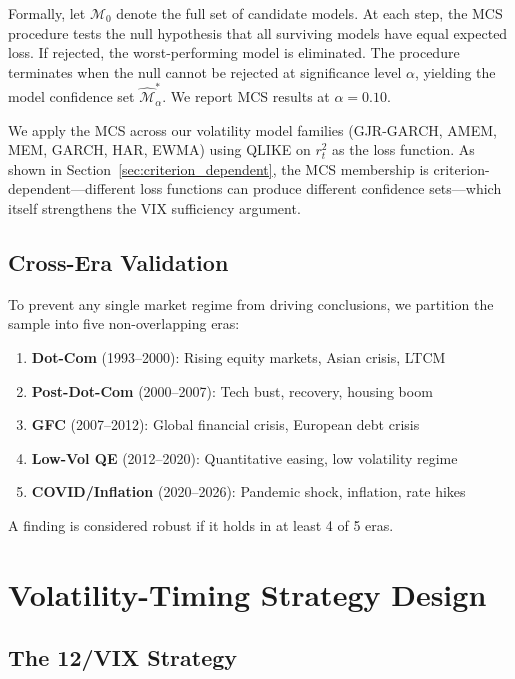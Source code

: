\documentclass[12pt,a4paper]{article}
\begin{document}
Formally, let $\mathcal{M}_0$ denote the full set of candidate models. At each step, the MCS procedure tests the null hypothesis that all surviving models have equal expected loss. If rejected, the worst-performing model is eliminated. The procedure terminates when the null cannot be rejected at significance level $\alpha$, yielding the model confidence set $\hat{\mathcal{M}}^*_\alpha$. We report MCS results at $\alpha = 0.10$.

We apply the MCS across our volatility model families (GJR-GARCH, AMEM, MEM, GARCH, HAR, EWMA) using QLIKE on $r_t^2$ as the loss function. As shown in Section~\ref{sec:criterion_dependent}, the MCS membership is criterion-dependent---different loss functions can produce different confidence sets---which itself strengthens the VIX sufficiency argument.

\subsection{Cross-Era Validation}

To prevent any single market regime from driving conclusions, we partition the sample into five non-overlapping eras:

\begin{enumerate}
    \item \textbf{Dot-Com} (1993--2000): Rising equity markets, Asian crisis, LTCM
    \item \textbf{Post-Dot-Com} (2000--2007): Tech bust, recovery, housing boom
    \item \textbf{GFC} (2007--2012): Global financial crisis, European debt crisis
    \item \textbf{Low-Vol QE} (2012--2020): Quantitative easing, low volatility regime
    \item \textbf{COVID/Inflation} (2020--2026): Pandemic shock, inflation, rate hikes
\end{enumerate}

A finding is considered robust if it holds in at least 4 of 5 eras.


\section{Volatility-Timing Strategy Design}
\label{sec:strategy}

\subsection{The 12/VIX Strategy}
\end{document}
